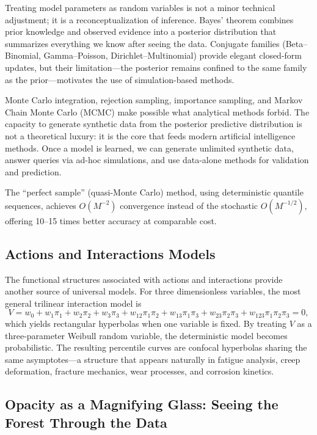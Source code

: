 Treating model parameters as random variables is not a minor technical adjustment; it is a reconceptualization of inference. Bayes' theorem combines prior knowledge and observed evidence into a posterior distribution that summarizes everything we know after seeing the data. Conjugate families (Beta–Binomial, Gamma–Poisson, Dirichlet–Multinomial) provide elegant closed-form updates, but their limitation—the posterior remains confined to the same family as the prior—motivates the use of simulation-based methods.

Monte Carlo integration, rejection sampling, importance sampling, and Markov Chain Monte Carlo (MCMC) make possible what analytical methods forbid. The capacity to generate synthetic data from the posterior predictive distribution is not a theoretical luxury: it is the core that feeds modern artificial intelligence methods. Once a model is learned, we can generate unlimited synthetic data, answer queries via ad-hoc simulations, and use data-alone methods for validation and prediction.

The ``perfect sample'' (quasi-Monte Carlo) method, using deterministic quantile sequences, achieves \(O(M^{-2})\) convergence instead of the stochastic \(O(M^{-1/2})\), offering 10--15 times better accuracy at comparable cost.

\subsection{Actions and Interactions Models}

The functional structures associated with actions and interactions provide another source of universal models. For three dimensionless variables, the most general trilinear interaction model is
\[
V = w_0 + w_1\pi_1 + w_2\pi_2 + w_3\pi_3 + w_{12}\pi_1\pi_2 + w_{13}\pi_1\pi_3 + w_{23}\pi_2\pi_3 + w_{123}\pi_1\pi_2\pi_3 = 0,
\]
which yields rectangular hyperbolas when one variable is fixed. By treating \(V\) as a three-parameter Weibull random variable, the deterministic model becomes probabilistic. The resulting percentile curves are confocal hyperbolas sharing the same asymptotes—a structure that appears naturally in fatigue analysis, creep deformation, fracture mechanics, wear processes, and corrosion kinetics.

\subsection{Opacity as a Magnifying Glass: Seeing the Forest Through the Data}

